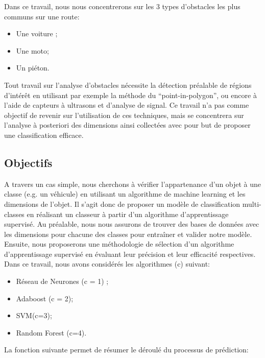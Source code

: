 \documentclass[a4paper]{report}
\begin{document}
Dans ce travail, nous nous concentrerons sur les 3 types d’obstacles les plus communs sur une route:
\begin{itemize}
\item Une voiture ;
\item Une moto;
\item Un piéton.

\end{itemize}

Tout travail sur l’analyse d’obstacles nécessite la détection préalable de régions d’intérêt en utilisant par exemple la méthode du “point-in-polygon”\cite{ref1}, ou encore à l’aide de capteurs à ultrasons et d’analyse de signal\cite{ref2}. Ce travail n’a pas comme objectif de revenir sur l’utilisation de ces techniques, mais se concentrera sur l’analyse à posteriori des dimensions ainsi collectées avec pour but de proposer une classification efficace. 

\subsection*{Objectifs}
A travers un cas simple, nous cherchons à vérifier l’appartenance d’un objet à une classe (e.g. un véhicule) en utilisant un algorithme de machine learning et les dimensions de l’objet. Il s’agit donc de proposer un modèle de classification multi-classes en réalisant un classeur à partir d’un algorithme d’apprentissage supervisé. 
Au préalable, nous nous assurons de trouver des bases de données avec les dimensions pour chacune des classes pour entraîner et valider notre modèle. 
Ensuite, nous proposerons une méthodologie de sélection d’un algorithme d’apprentissage supervisé en évaluant leur précision et leur efficacité respectives. Dans ce travail, nous avons considérés les algorithmes (c) suivant: 
\begin{itemize}
\item Réseau de Neurones (c = 1) ;
\item Adaboost (c = 2);
\item SVM(c=3);
\item Random Forest (c=4).
\end{itemize}
\medbreak

La fonction suivante permet de résumer le déroulé du processus de prédiction:\\
\end{document}

